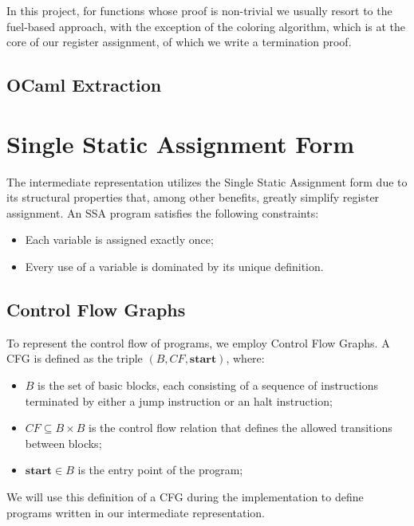 In this project, for functions whose proof is non-trivial we usually resort to the fuel-based approach, with the exception of the coloring algorithm, which is at the core of our register assignment, of which we write a termination proof.

\subsection{OCaml Extraction}
\label{subsec:extract}

\section{Single Static Assignment Form}
\label{sec:ssa}

The intermediate representation utilizes the Single Static Assignment form due to its structural properties that, among other benefits, greatly simplify register assignment. An SSA program satisfies the following constraints:

\begin{itemize}
    \item Each variable is assigned exactly once;
    \item Every use of a variable is dominated by its unique definition.
\end{itemize}

\subsection{Control Flow Graphs}
\label{subsec:cfg}

To represent the control flow of programs, we employ Control Flow Graphs. A CFG is defined as the triple $(B, CF, \textbf{start})$, where:

\begin{itemize}
    \item $B$ is the set of basic blocks, each consisting of a sequence of instructions terminated by either a jump instruction or an halt instruction;
    \item $CF \subseteq B \times B$ is the control flow relation that defines the allowed transitions between blocks;
    \item $\textbf{start} \in B$ is the entry point of the program;
\end{itemize}

We will use this definition of a CFG during the implementation to define programs written in our intermediate representation.

